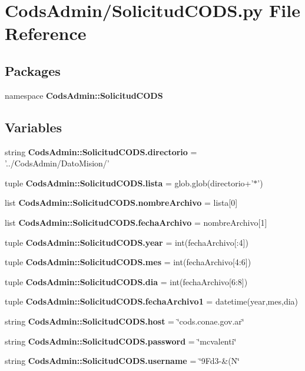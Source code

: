 \section{\-Cods\-Admin/\-Solicitud\-C\-O\-D\-S.py \-File \-Reference}
\label{_solicitud_c_o_d_s_8py}
\subsection*{\-Packages}
\begin{DoxyCompactItemize}
\item 
namespace {\bf \-Cods\-Admin\-::\-Solicitud\-C\-O\-D\-S}
\end{DoxyCompactItemize}
\subsection*{\-Variables}
\begin{DoxyCompactItemize}
\item 
string {\bf \-Cods\-Admin\-::\-Solicitud\-C\-O\-D\-S.\-directorio} = '../\-Cods\-Admin/\-Dato\-Mision/'
\item 
tuple {\bf \-Cods\-Admin\-::\-Solicitud\-C\-O\-D\-S.\-lista} = glob.\-glob(directorio+'$\ast$')
\item 
list {\bf \-Cods\-Admin\-::\-Solicitud\-C\-O\-D\-S.\-nombre\-Archivo} = lista[0]
\item 
list {\bf \-Cods\-Admin\-::\-Solicitud\-C\-O\-D\-S.\-fecha\-Archivo} = nombre\-Archivo[1]
\item 
tuple {\bf \-Cods\-Admin\-::\-Solicitud\-C\-O\-D\-S.\-year} = int(fecha\-Archivo[\-:4])
\item 
tuple {\bf \-Cods\-Admin\-::\-Solicitud\-C\-O\-D\-S.\-mes} = int(fecha\-Archivo[4\-:6])
\item 
tuple {\bf \-Cods\-Admin\-::\-Solicitud\-C\-O\-D\-S.\-dia} = int(fecha\-Archivo[6\-:8])
\item 
tuple {\bf \-Cods\-Admin\-::\-Solicitud\-C\-O\-D\-S.\-fecha\-Archivo1} = datetime(year,mes,dia)
\item 
string {\bf \-Cods\-Admin\-::\-Solicitud\-C\-O\-D\-S.\-host} = \char`\"{}cods.\-conae.\-gov.\-ar\char`\"{}
\item 
string {\bf \-Cods\-Admin\-::\-Solicitud\-C\-O\-D\-S.\-password} = \char`\"{}mcvalenti\char`\"{}
\item 
string {\bf \-Cods\-Admin\-::\-Solicitud\-C\-O\-D\-S.\-username} = \char`\"{}9\-Fd3-\/\&(\-N\char`\"{}
\end{DoxyCompactItemize}
